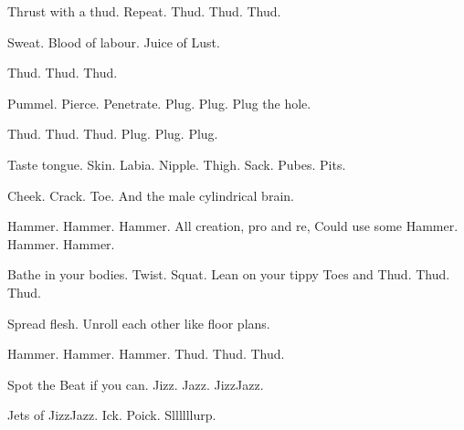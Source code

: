 \documentclass{article}
\begin{document}
\newline

Thrust with a thud. Repeat. Thud. Thud. Thud.
\newline
\newline

Sweat. Blood of labour. Juice of Lust.
\newline
\newline

Thud. Thud. Thud. 
\newline
\newline

Pummel. Pierce. Penetrate. Plug. Plug. Plug the hole.
\newline
\newline

Thud. Thud. Thud. Plug. Plug. Plug.
\newline
\newline

Taste tongue. Skin. Labia. Nipple. Thigh. Sack. Pubes. Pits.
\newline
\newline

Cheek. Crack. Toe. And the male cylindrical brain.
\newline
\newline

Hammer. Hammer. Hammer. All creation, pro and re,
\newline
Could use some Hammer. Hammer. Hammer.
\newline

Bathe in your bodies. Twist. Squat. Lean on your tippy
\newline
Toes and Thud. Thud. Thud.
\newline
\newline

Spread flesh. Unroll each other like floor plans.
\newline
\newline

Hammer. Hammer. Hammer. Thud. Thud. Thud.
\newline
\newline

Spot the Beat if you can. Jizz. Jazz. JizzJazz. 
\newline 
\newline

Jets of JizzJazz. Ick. Poick. Sllllllurp. 
\newline 
\newline
\end{document}
